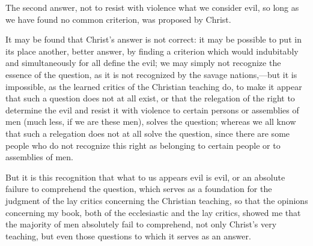 \documentclass{book}
\begin{document}
The second answer, not to resist with violence what we consider evil, so long as we have found no common criterion, was proposed by Christ.

It may be found that Christ’s answer is not correct: it may be possible to put in its place another, better answer, by finding a criterion which would indubitably and simultaneously for all define the evil; we may simply not recognize the essence of the question, as it is not recognized by the savage nations,—but it is impossible, as the learned critics of the Christian teaching do, to make it appear that such a question does not at all exist, or that the relegation of the right to determine the evil and resist it with violence to certain persons or assemblies of men (much less, if we are these men), solves the question; whereas we all know that such a relegation does not at all solve the question, since there are some people who do not recognize this right as belonging to certain people or to assemblies of men.

But it is this recognition that what to us appears evil is evil, or an absolute failure to comprehend the question, which serves as a foundation for the judgment of the lay critics concerning the Christian teaching, so that the opinions concerning my book, both of the ecclesiastic and the lay critics, showed me that the majority of men absolutely fail to comprehend, not only Christ’s very teaching, but even those questions to which it serves as an answer.
\end{document}
